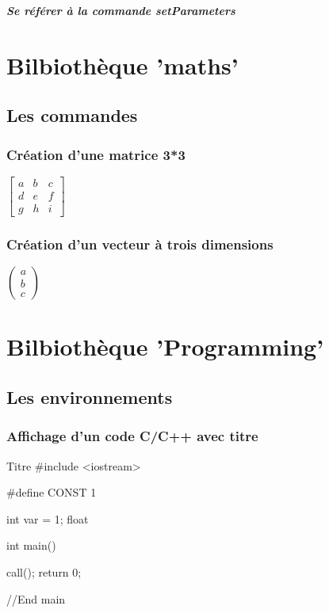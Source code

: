 \documentclass[12pt]{report}
\newcommand{\bi}[1]{\textit{\textbf{#1}}}
\newcommand{\evec}[3]{\left (\begin{array}{ccc} #1 \\ #2 \\ #3\end{array} \right )}
\newcommand{\emat}[3]{\left [\begin{array}{ccc} #1 \\ #2 \\ #3\end{array} \right ]}
\begin{document}
\bi{Se référer à la commande setParameters}



\chapter{Bilbiothèque 'maths'}


\section{Les commandes}


\subsection{Création d'une matrice 3*3}


$\emat{a & b & c}{d & e & f}{g & h & i}  $

\subsection{Création d'un vecteur à trois dimensions}
$\evec{a}{b}{c}  $





\chapter{Bilbiothèque 'Programming'}


\section{Les environnements}


\subsection{Affichage d'un code C/C++ avec titre}


\begin{Cpp}{Titre}
#include <iostream>

#define CONST 1

int var = 1;
float 

int main() {
  
  call();
  return 0;

}//End main

\end{Cpp}
\end{document}
